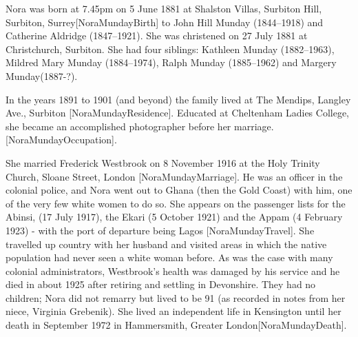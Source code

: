 
Nora was born at 7.45pm on 5 June 1881 at  Shalston Villas, Surbiton Hill,  Surbiton, Surrey[NoraMundayBirth] to John Hill Munday (1844--1918) and Catherine Aldridge (1847--1921). She was christened on 27 July 1881 at Christchurch, Surbiton.	She had four siblings: Kathleen Munday (1882--1963), Mildred Mary Munday (1884--1974), Ralph Munday (1885--1962) and Margery Munday(1887-?).

In the years  1891 to 1901 (and beyond)  the family lived at The Mendips, Langley Ave., Surbiton [NoraMundayResidence].  Educated at Cheltenham Ladies College, she became an accomplished photographer before her marriage.
[NoraMundayOccupation].


She married Frederick Westbrook on 8 November 1916 at the Holy Trinity Church, Sloane Street, London [NoraMundayMarriage].  He was an officer in the colonial police, and Nora went out to Ghana (then the Gold Coast) with him, one of the very few white women to do so. She appears on the passenger lists for the Abinsi, (17 July 1917), the Ekari (5 October 1921) and the Appam (4 February 1923) - with the port of departure being Lagos [NoraMundayTravel]. She travelled up country with her husband and visited areas in which the native population had never seen a white woman before. As was the case with many colonial administrators, Westbrook's health was damaged by his service and he died in about 1925 after retiring and settling in Devonshire. They had no children; Nora did not remarry but lived to be 91 (as recorded in notes from her niece, Virginia Grebenik). She lived an independent life in Kensington until her death in September 1972 in 	Hammersmith, Greater London[NoraMundayDeath].

